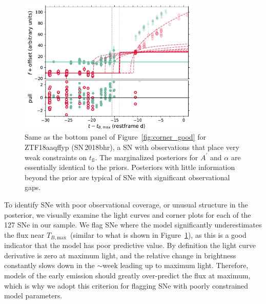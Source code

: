 \documentclass[twocolumn]{aastex63}
\newcommand{\tfl}{$t_\mathrm{fl}$}
\newcommand{\tbmax}{$T_{B,\mathrm{max}}$}
\begin{document}
\begin{figure}
    \centering
    \includegraphics[width=3.4in]{./figures/ZTF18aaqffyp_model_lc.pdf}
    \caption{Same as the bottom panel of Figure~\ref{fig:corner_good} for
    ZTF18aaqffyp (SN\,2018bhr), a SN with observations that place very weak
    constraints on \tfl. The marginalized posteriors for $A^\prime$ and
    $\alpha$ are essentially identical to the priors. Posteriors with little
    information beyond the prior are typical of SNe with significant
    observational gaps.}
    \label{fig:biggap_lc}
\end{figure}

To identify SNe with poor observational coverage, or unusual structure in the
posterior, we visually examine the light curves and corner plots for each of
the 127 SNe in our sample. We flag SNe where the model significantly
underestimates the flux near \tbmax\ (similar to what is shown in
Figure~\ref{fig:biggap_lc}), as this is a good indicator that the model has
poor predictive value. By definition the light curve derivative is zero at
maximum light, and the relative change in brightness constantly slows down in
the $\sim$week leading up to maximum light. Therefore, models of the early
emission should greatly over-predict the flux at maximum, which is why we
adopt this criterion for flagging SNe with poorly constrained model
parameters.
\end{document}
